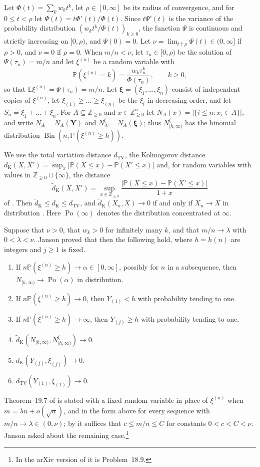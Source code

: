 \documentclass[11pt]{amsart}
\theoremstyle{definition}
\theoremstyle{remark}
\numberwithin{equation}{section}
\newcommand{\Pp}{\mathbb P}
\newcommand{\E}{\mathbb E}
\newcommand{\Z}{\mathbb Z}
\newcommand{\dtv}{d_{\mathrm{TV}}}
\newcommand{\dK}{d_{\mathrm K}}
\newcommand{\dKt}{\tilde d_{\mathrm K}}
\newcommand{\bY}{\mathbf Y}
\newcommand{\bxi}{\boldsymbol\xi}
\DeclareMathOperator{\Po}{Po}
\DeclareMathOperator{\Bin}{Bin}
\begin{document}
Let $\Phi(t)=\sum_kw_kt^k$, let $\rho\in[0,\infty]$ be its radius of convergence, and for $0\le t<\rho$ let $\Psi(t)=t\Phi'(t)/\Phi(t)$. Since $t\Psi'(t)$ is the variance of the probability distribution $(w_kt^k/\Phi(t))_{k\ge0}$, the function $\Psi$ is continuous and strictly increasing on $[0,\rho)$, and $\Psi(0)=0$. Let $\nu=\lim_{t\uparrow\rho}\Psi(t)\in(0,\infty]$ if $\rho>0$, and $\nu=0$ if $\rho=0$. When $m/n<\nu$, let $\tau_n\in[0,\rho)$ be the solution of $\Psi(\tau_n)=m/n$ and let $\xi^{(n)}$ be a random variable with
\[
\Pp(\xi^{(n)}=k)=\frac{w_k\tau_n^k}{\Phi(\tau_n)},\qquad k\ge0,
\]
so that $\E\xi^{(n)}=\Psi(\tau_n)=m/n$. Let $\bxi=(\xi_1,\dots,\xi_n)$ consist of independent copies of $\xi^{(n)}$, let $\xi_{(1)}\ge\dots\ge\xi_{(n)}$ be the $\xi_i$ in decreasing order, and let $S_n=\xi_1+\dots+\xi_n$. For $A\subseteq\Z_{\ge0}$ and $x\in\Z_{\ge0}^n$ let $N_A(x)=|\{i\le n:x_i\in A\}|$, and write $N_A=N_A(\bY)$ and $N^\xi_A=N_A(\bxi)$; thus $N^\xi_{[h,\infty)}$ has the binomial distribution $\Bin(n,\Pp(\xi^{(n)}\ge h))$.

We use the total variation distance $\dtv$, the Kolmogorov distance $\dK(X,X')=\sup_x|\Pp(X\le x)-\Pp(X'\le x)|$ and, for random variables with values in $\Z_{\ge0}\cup\{\infty\}$, the distance
\[
\dKt(X,X')=\sup_{x\in\Z_{\ge0}}\frac{|\Pp(X\le x)-\Pp(X'\le x)|}{1+x}
\]
of \cite[(19.13)]{J12}. Then $\dKt\le\dK\le\dtv$, and $\dKt(X_n,X)\to0$ if and only if $X_n\to X$ in distribution \cite[Lemma~19.5]{J12}. Here $\Po(\infty)$ denotes the distribution concentrated at $\infty$.

Suppose that $\nu>0$, that $w_k>0$ for infinitely many $k$, and that $m/n\to\lambda$ with $0<\lambda<\nu$. Janson \cite[Theorem~19.7]{J12} proved that then the following hold, where $h=h(n)$ are integers and $j\ge1$ is fixed.
\begin{enumerate}[label=(\roman*)]
\item If $n\Pp(\xi^{(n)}\ge h)\to\alpha\in[0,\infty]$, possibly for $n$ in a subsequence, then $N_{[h,\infty)}\to\Po(\alpha)$ in distribution.
\item If $n\Pp(\xi^{(n)}\ge h)\to0$, then $Y_{(1)}<h$ with probability tending to one.
\item If $n\Pp(\xi^{(n)}\ge h)\to\infty$, then $Y_{(j)}\ge h$ with probability tending to one.
\item $\dKt(N_{[h,\infty)},N^\xi_{[h,\infty)})\to0$.
\item $\dK(Y_{(j)},\xi_{(j)})\to0$.
\item $\dtv(Y_{(1)},\xi_{(1)})\to0$.
\end{enumerate}
Theorem~19.7 of \cite{J12} is stated with a fixed random variable in place of $\xi^{(n)}$ when $m=\lambda n+o(\sqrt n)$, and in the form above for every sequence with $m/n\to\lambda\in(0,\nu)$; by \cite[Remark~19.8]{J12} it suffices that $c\le m/n\le C$ for constants $0<c<C<\nu$. Janson asked about the remaining case.\footnote{In the arXiv version of \cite{J12} it is Problem~18.9.}
\end{document}
